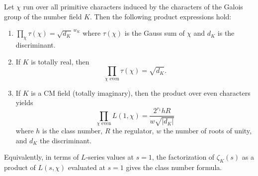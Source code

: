 Let $\chi$ run over all primitive characters induced by the characters of the Galois group of the number field $K$. Then the following product expressions hold:

\begin{enumerate}
\item[(i)] $\displaystyle \prod_{\chi} \tau(\chi) = \sqrt{d_K}^{\,w_K}$ where $\tau(\chi)$ is the Gauss sum of $\chi$ and $d_K$ is the discriminant.

\item[(ii)] If $K$ is totally real, then
$$\prod_{\chi \text{ even}} \tau(\chi) = \sqrt{d_K}.$$

\item[(iii)] If $K$ is a CM field (totally imaginary), then the product over even characters yields
$$\prod_{\chi \text{ even}} L(1, \chi) = \frac{2^{r_1} h R}{w \sqrt{|d_K|}}$$
where $h$ is the class number, $R$ the regulator, $w$ the number of roots of unity, and $d_K$ the discriminant.
\end{enumerate}

Equivalently, in terms of $L$-series values at $s=1$, the factorization of $\zeta_K(s)$ as a product of $L(s,\chi)$ evaluated at $s=1$ gives the class number formula.
